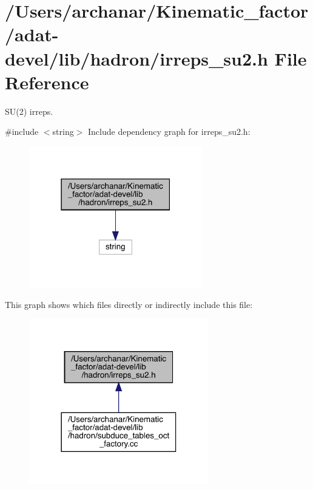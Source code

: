 \hypertarget{adat-devel_2lib_2hadron_2irreps__su2_8h}{}\section{/\+Users/archanar/\+Kinematic\+\_\+factor/adat-\/devel/lib/hadron/irreps\+\_\+su2.h File Reference}
\label{adat-devel_2lib_2hadron_2irreps__su2_8h}


S\+U(2) irreps.  


{\ttfamily \#include $<$string$>$}\newline
Include dependency graph for irreps\+\_\+su2.\+h\+:
\nopagebreak
\begin{figure}[H]
\begin{center}
\leavevmode
\includegraphics[width=214pt]{d0/d49/adat-devel_2lib_2hadron_2irreps__su2_8h__incl}
\end{center}
\end{figure}
This graph shows which files directly or indirectly include this file\+:
\nopagebreak
\begin{figure}[H]
\begin{center}
\leavevmode
\includegraphics[width=222pt]{d6/d15/adat-devel_2lib_2hadron_2irreps__su2_8h__dep__incl}
\end{center}
\end{figure}

